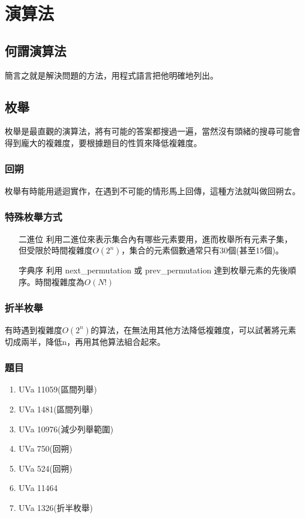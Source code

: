 \section{演算法}
\subsection{何謂演算法}
簡言之就是解決問題的方法，用程式語言把他明確地列出。
\subsection{枚舉}
枚舉是最直觀的演算法，將有可能的答案都搜過一遍，當然沒有頭緒的搜尋可能會得到龐大的複雜度，要根據題目的性質來降低複雜度。
\subsubsection{回朔}
枚舉有時能用遞迴實作，在遇到不可能的情形馬上回傳，這種方法就叫做回朔ㄊ。
\subsubsection{特殊枚舉方式}
\begin{enumerate}
\item [二進位] 利用二進位來表示集合內有哪些元素要用，進而枚舉所有元素子集，但受限於時間複雜度$O(2^n)$，集合的元素個數通常只有30個(甚至15個)。   
\item [字典序] 利用 next\_permutation 或 prev\_permutation 達到枚舉元素的先後順序。時間複雜度為$O(N!)$
\end{enumerate}
\subsubsection{折半枚舉}
有時遇到複雜度$O(2^n)$的算法，在無法用其他方法降低複雜度，可以試著將元素切成兩半，降低n，再用其他算法組合起來。
\subsubsection{題目}
\begin{enumerate}
\item UVa 11059(區間列舉)
\item UVa 1481(區間列舉)
\item UVa 10976(減少列舉範圍)
\item UVa 750(回朔)
\item UVa 524(回朔)
\item UVa 11464
\item UVa 1326(折半枚舉)
\end{enumerate}
